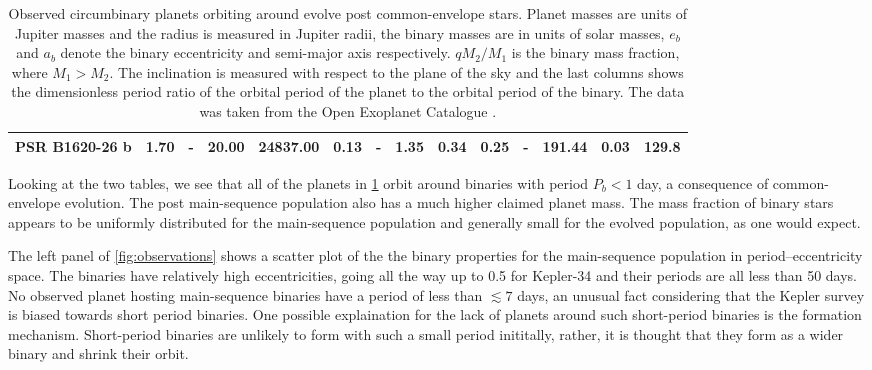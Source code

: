 \documentclass[ twoside,openright,titlepage,numbers=noenddot,headinclude,%
                footinclude=true,cleardoublepage=empty,abstractoff, %
                BCOR=5mm,paper=a4,fontsize=11pt,%
                american,%
                ]{scrreprt}
\begin{document}
\begin{table}
\begin{tabular}{lccccccccccccc}
    PSR B1620-26 b     &   1.70 & - &  20.00 &  24837.00 &  0.13 &   - &    1.35 &    0.34 &  0.25 &       - &    191.44 &      0.03 & 129.8\\
\bottomrule
\end{tabular}\caption{Observed circumbinary planets orbiting around evolve post 
common-envelope 
    stars. Planet masses are units of Jupiter masses and the radius is measured
    in Jupiter radii, the binary masses are in units of solar masses, $e_b$ and
    $a_b$ denote the binary eccentricity and semi-major axis respectively. $qM_2/M_1$ is the 
    binary mass fraction, where $M_1>M_2$. The inclination is measured with
    respect to the plane of the sky and the last columns shows the dimensionless 
    period ratio of the orbital period of the planet to the orbital period of the
    binary. The data was taken from the Open Exoplanet Catalogue \citep{catalogue}.}
\label{table:timing_planets}
\end{table}

Looking at the two tables, we see that all of the planets
in \cref{table:timing_planets} orbit around binaries with period $P_b<1$ day, a 
consequence of common-envelope evolution.
The post main-sequence population also has a much higher claimed planet mass. 
The mass fraction of binary stars appears to be uniformly distributed for 
the main-sequence population and generally small for the evolved population,
as one would expect.

The left panel of \cref{fig:observations} shows a scatter plot of the 
the binary properties for the main-sequence population in 
period--eccentricity space. The binaries have relatively high eccentricities,
going all the way up to 0.5 for Kepler-34 and their periods 
are all less than 50 days. No observed 
planet hosting main-sequence 
binaries have a period of less than $\lesssim 7$ days, an unusual fact
considering that the Kepler survey is biased towards short period binaries.
One possible explaination for the lack of planets around such short-period
binaries is the formation mechanism. Short-period binaries are unlikely
to form with such a small period inititally, rather, it is thought that 
they form as a wider binary and shrink their orbit.
\end{document}
